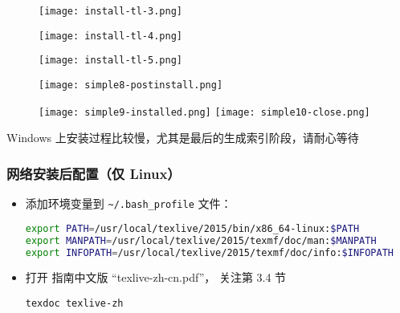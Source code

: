 \begin{frame}
  \begin{figure}[h]
    \centering
    \texttt{[image: install-tl-3.png]}
  \end{figure}
\end{frame}


\begin{frame}
  \begin{figure}[h]
    \centering
    \texttt{[image: install-tl-4.png]}
  \end{figure}
\end{frame}

\begin{frame}
  \begin{figure}[h]
    \centering
    \texttt{[image: install-tl-5.png]}
  \end{figure}
\end{frame}

\begin{frame}
  \begin{figure}[h]
    \centering
    \texttt{[image: simple8-postinstall.png]}
  \end{figure}
\end{frame}

\begin{frame}
  \begin{figure}[h]
    \centering
    \texttt{[image: simple9-installed.png]}%
    \hspace{2em}
    \texttt{[image: simple10-close.png]}
  \end{figure}
  
  \centering Windows 上安装过程比较慢，尤其是最后的生成索引阶段，请耐心等待

\end{frame}

\begin{frame}[fragile]
  \frametitle{网络安装后配置（仅 Linux）}
  \begin{itemize}
    \item
      添加环境变量到 \nolinkurl{~/.bash_profile} 文件：
      \begin{lstlisting}[language=bash]
export PATH=/usr/local/texlive/2015/bin/x86_64-linux:$PATH
export MANPATH=/usr/local/texlive/2015/texmf/doc/man:$MANPATH
export INFOPATH=/usr/local/texlive/2015/texmf/doc/info:$INFOPATH
      \end{lstlisting}
  \item
    打开 \TeXLive 指南中文版 ``texlive-zh-cn.pdf''，
    关注第 3.4 节
      \begin{lstlisting}[basicstyle=\ttfamily]
texdoc texlive-zh
      \end{lstlisting}
  \end{itemize}
\end{frame}

